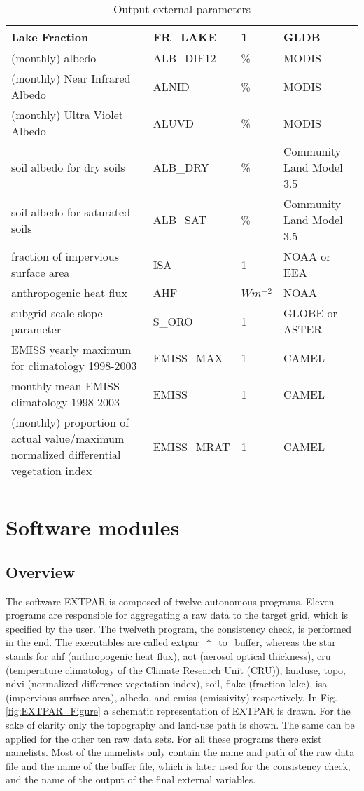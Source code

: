 \documentclass[a4paper,10pt,DIV14,BCOR1cm,titlepage,twoside]{scrartcl}
\providecommand{\tabularnewline}{\\}
\begin{document}
\begin{longtable}{|p{6.5cm}|p{3cm}|p{1.6cm}|p{3.5cm}|}
Lake Fraction  &FR\_\-LAKE  &1  & GLDB 
\tabularnewline \hline
(monthly) albedo & ALB\_DIF12 &\% & MODIS
\tabularnewline \hline
(monthly) Near Infrared Albedo & ALNID &\% & MODIS
\tabularnewline \hline
(monthly) Ultra Violet Albedo & ALUVD &\% & MODIS
\tabularnewline\hline
soil albedo for dry soils &ALB\_\-DRY &\% & Community Land Model 3.5
\tabularnewline\hline
soil albedo for saturated soils &ALB\_\-SAT &\% & Community Land Model 3.5
\tabularnewline\hline
fraction of impervious surface area &ISA &1 & NOAA or EEA
\tabularnewline\hline
anthropogenic heat flux &AHF &$W m^{-2}$ & NOAA
\tabularnewline\hline
subgrid-scale slope parameter &S\_ORO &1 & GLOBE or ASTER
\tabularnewline\hline
EMISS yearly maximum for climatology 1998-2003 &EMISS\_MAX &1 & CAMEL
\tabularnewline\hline
monthly mean EMISS climatology 1998-2003 &EMISS &1 & CAMEL
\tabularnewline\hline
(monthly) proportion of actual value/maximum normalized differential vegetation index &EMISS\_MRAT &1 & CAMEL
\tabularnewline\hline
\bottomrule
\caption{Output external parameters}
\label{extpar_output}
\end{longtable}


\section{Software modules}\label{Software_modules}
\subsection{Overview}\label{Overview}
The software EXTPAR is composed of twelve autonomous programs. Eleven programs are responsible for aggregating a raw data to the target grid, which is specified by the user. The twelveth program, the consistency check, is performed in the end. The executables are called extpar\_$\ast$\_to\_buffer, whereas the star stands for ahf (anthropogenic heat flux), aot (aerosol optical thickness), cru (temperature climatology of the Climate Research Unit (CRU)), landuse, topo, ndvi (normalized difference vegetation index), soil, flake (fraction lake), isa (impervious surface area), albedo, and emiss (emissivity) respectively. In Fig. \ref{fig:EXTPAR_Figure} a schematic representation of EXTPAR is drawn. For the sake of clarity only the topography and land-use path is shown. The same can be applied for the other ten raw data sets. For all these programs there exist namelists. Most of the namelists only contain the name and path of the raw data file and the name of the buffer file, which is later used for the consistency check, and the name of the output of the final external variables. \par\medskip\noindent
\end{document}
